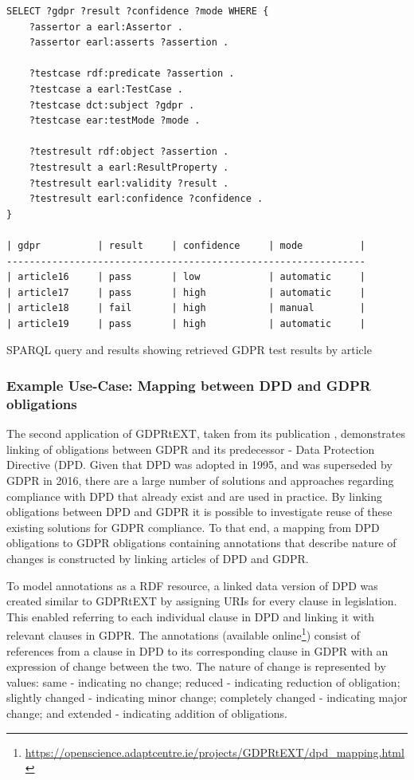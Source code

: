 \begin{listing}
\begin{verbatim}
SELECT ?gdpr ?result ?confidence ?mode WHERE {
    ?assertor a earl:Assertor .
    ?assertor earl:asserts ?assertion .

    ?testcase rdf:predicate ?assertion .
    ?testcase a earl:TestCase .
    ?testcase dct:subject ?gdpr .
    ?testcase ear:testMode ?mode .

    ?testresult rdf:object ?assertion .
    ?testresult a earl:ResultProperty .
    ?testresult earl:validity ?result .
    ?testresult earl:confidence ?confidence .
}

| gdpr          | result     | confidence     | mode          |
---------------------------------------------------------------
| article16     | pass       | low            | automatic     |
| article17     | pass       | high           | automatic     |
| article18     | fail       | high           | manual        |
| article19     | pass       | high           | automatic     |
\end{verbatim}
\caption{SPARQL query and results showing retrieved GDPR test results by article}
\label{code:voc:gdprtext-sparql}
\end{listing}

\subsubsection{Example Use-Case: Mapping between DPD and GDPR obligations}
The second application of GDPRtEXT, taken from its publication \cite{pandit_gdprtext_2018}, demonstrates linking of obligations between GDPR and its predecessor - Data Protection Directive (DPD. Given that DPD was adopted in 1995, and was superseded by GDPR in 2016, there are a large number of solutions and approaches regarding compliance with DPD that already exist and are used in practice. By linking obligations between DPD and GDPR it is possible to investigate reuse of these existing solutions for GDPR compliance. To that end, a mapping from DPD obligations to GDPR obligations containing annotations that describe nature of changes is constructed by linking articles of DPD and GDPR.

To model annotations as a RDF resource, a linked data version of DPD was created similar to GDPRtEXT by assigning URIs for every clause in legislation. This enabled referring to each individual clause in DPD and linking it with relevant clauses in GDPR. 
The annotations (available online\footnote{\url{https://openscience.adaptcentre.ie/projects/GDPRtEXT/dpd_mapping.html}}) consist of references from a clause in DPD to its corresponding clause in GDPR with an expression of change between the two. The nature of change is represented by values: same - indicating no change; reduced - indicating reduction of obligation; slightly changed - indicating minor change; completely changed - indicating major change; and extended - indicating addition of obligations.

